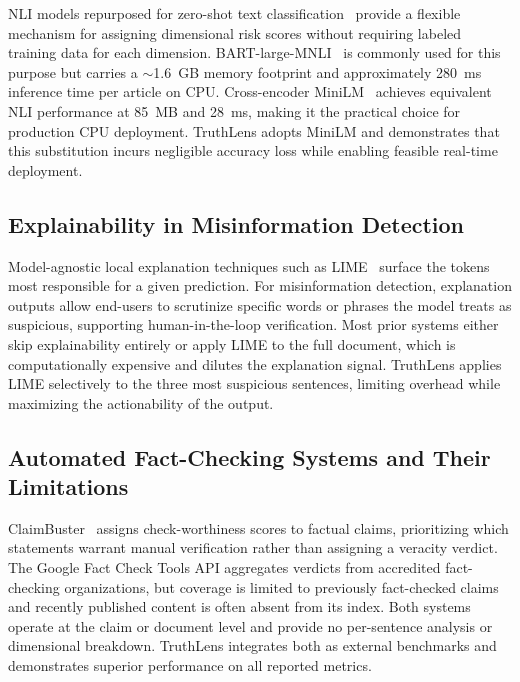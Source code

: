 \documentclass[journal]{IEEEtran}
\begin{document}
NLI models repurposed for zero-shot text classification~\cite{yin2019benchmarking} provide
a flexible mechanism for assigning dimensional risk scores without requiring labeled training
data for each dimension. BART-large-MNLI~\cite{lewis2020bart} is commonly used for this
purpose but carries a $\sim$1.6~GB memory footprint and approximately 280~ms inference time
per article on CPU. Cross-encoder MiniLM~\cite{reimers2019sentence} achieves equivalent
NLI performance at 85~MB and 28~ms, making it the practical choice for production CPU
deployment. TruthLens adopts MiniLM and demonstrates that this substitution incurs
negligible accuracy loss while enabling feasible real-time deployment.

\subsection{Explainability in Misinformation Detection}

Model-agnostic local explanation techniques such as LIME~\cite{ribeiro2016trust} surface
the tokens most responsible for a given prediction. For misinformation detection, explanation
outputs allow end-users to scrutinize specific words or phrases the model treats as
suspicious, supporting human-in-the-loop verification. Most prior systems either skip
explainability entirely or apply LIME to the full document, which is computationally
expensive and dilutes the explanation signal. TruthLens applies LIME selectively to the
three most suspicious sentences, limiting overhead while maximizing the actionability of the
output.

\subsection{Automated Fact-Checking Systems and Their Limitations}

ClaimBuster~\cite{hassan2017claimbuster} assigns check-worthiness scores to factual claims,
prioritizing which statements warrant manual verification rather than assigning a veracity
verdict. The Google Fact Check Tools API aggregates verdicts from accredited fact-checking
organizations, but coverage is limited to previously fact-checked claims and recently
published content is often absent from its index. Both systems operate at the claim or
document level and provide no per-sentence analysis or dimensional breakdown. TruthLens
integrates both as external benchmarks and demonstrates superior performance on all reported
metrics.
\end{document}
